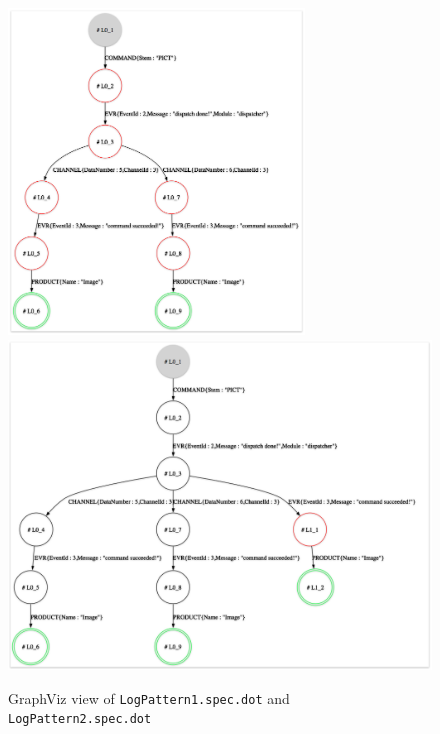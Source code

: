 \documentclass{report}
\begin{document}
\begin{figure}[htbp]
\begin{center}
\includegraphics[width=0.7\textwidth]{graphics/LearnedPattern1}
\includegraphics[width=1.0\textwidth]{graphics/LearnedPattern2}
\caption{GraphViz view of {\tt LogPattern1.spec.dot} and {\tt LogPattern2.spec.dot}}
\label{fig:viz_learned_specs}
\end{center}
\end{figure}

\newpage
\end{document}
